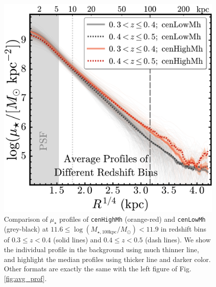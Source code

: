 \documentclass{emulateapj}
\def\rbcg{\texttt{cenHighMh}}
\def\nbcg{\texttt{cenLowMh}}
\def\logmtot{{$\log (M_{\star,100\mathrm{kpc}}/M_{\odot})$}}
\def\mden{{$\mu_{\star}$}}
\begin{document}
\begin{CJK*}{UTF8}{gbsn}
\begin{figure}[htb!]
    \centering 
    \includegraphics[width=13.0cm]{fig/redbcg_avg_prof_z}
    \caption{Comparison of \mden{} profiles of \rbcg{} (orange-red) and \nbcg{} 
        (grey-black) at $11.6 \le$\logmtot$< 11.9$ in redshift bins of 
        $0.3\leq z<0.4$ (solid lines) and $0.4\leq z<0.5$ (dash lines). 
        We show the individual profile in the background using much thinner line, 
        and highlight the median profiles using thicker line and darker color.
        Other formats are exactly the same with the left figure of 
        Fig.\ref{fig:avg_prof}.}
    \label{fig:D1}
\end{figure}    
    

\end{CJK*}
\end{document}

